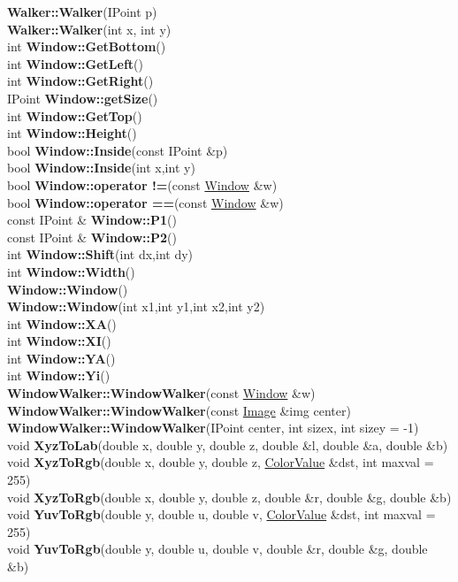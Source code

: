 \documentclass[10pt,titlepage]{article}
\def\functionlistentry#1#2#3#4#5#6{\noindent #1 {\bf #2}(#3) \dotfill #6\\}
\begin{document}
{{\functionlistentry{}{Walker::Walker}{IPoint p}{175}{datastructures}{}
\functionlistentry{}{Walker::Walker}{int x, int y}{176}{datastructures}{}
\functionlistentry{int}{Window::GetBottom}{}{214}{datastructures}{}
\functionlistentry{int}{Window::GetLeft}{}{208}{datastructures}{}
\functionlistentry{int}{Window::GetRight}{}{210}{datastructures}{}
\functionlistentry{IPoint}{Window::getSize}{}{218}{datastructures}{}
\functionlistentry{int}{Window::GetTop}{}{212}{datastructures}{}
\functionlistentry{int}{Window::Height}{}{207}{datastructures}{}
\functionlistentry{bool}{Window::Inside}{const IPoint \&p}{219}{datastructures}{}
\functionlistentry{bool}{Window::Inside}{int x,int y}{220}{datastructures}{}
\functionlistentry{bool}{Window::operator !=}{const \hyperlink{Window}{Window} \&w}{222}{datastructures}{}
\functionlistentry{bool}{Window::operator ==}{const \hyperlink{Window}{Window} \&w}{221}{datastructures}{}
\functionlistentry{const IPoint \&}{Window::P1}{}{216}{datastructures}{}
\functionlistentry{const IPoint \&}{Window::P2}{}{217}{datastructures}{}
\functionlistentry{int}{Window::Shift}{int dx,int dy}{223}{datastructures}{}
\functionlistentry{int}{Window::Width}{}{206}{datastructures}{}
\functionlistentry{}{Window::Window}{}{204}{datastructures}{}
\functionlistentry{}{Window::Window}{int x1,int y1,int x2,int y2}{205}{datastructures}{}
\functionlistentry{int}{Window::XA}{}{211}{datastructures}{}
\functionlistentry{int}{Window::XI}{}{209}{datastructures}{}
\functionlistentry{int}{Window::YA}{}{215}{datastructures}{}
\functionlistentry{int}{Window::Yi}{}{213}{datastructures}{}
\functionlistentry{}{WindowWalker::WindowWalker}{const \hyperlink{Window}{Window} \&w}{182}{datastructures}{}
\functionlistentry{}{WindowWalker::WindowWalker}{const \hyperlink{Image}{Image} \&img center}{183}{datastructures}{}
\functionlistentry{}{WindowWalker::WindowWalker}{IPoint center, int sizex, int sizey = -1}{184}{datastructures}{}
\functionlistentry{void}{XyzToLab}{double x, double y, double z, double \&l, double \&a, double \&b}{313}{datastructures}{}
\functionlistentry{void}{XyzToRgb}{double x, double y, double z, \hyperlink{ColorValue}{ColorValue} \&dst, int maxval = 255}{305}{datastructures}{}
\functionlistentry{void}{XyzToRgb}{double x, double y, double z, double \&r, double \&g, double \&b}{312}{datastructures}{}
\functionlistentry{void}{YuvToRgb}{double y, double u, double v, \hyperlink{ColorValue}{ColorValue} \&dst, int maxval = 255}{304}{datastructures}{}
\functionlistentry{void}{YuvToRgb}{double y, double u, double v, double \&r, double \&g, double \&b}{309}{datastructures}{}

}}
\end{document}
